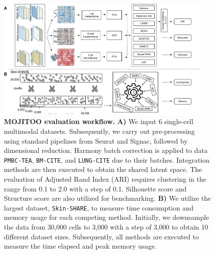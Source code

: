 \begin{figure}[!ht]
	\centering
	\includegraphics[width=0.95\textwidth]{evaluation_MOJITOO/fig}
	\vspace{0.1cm}
	\caption[MOJITOO evaluation workflow]{
	\textbf{MOJITOO evaluation workflow.} \textbf{A)} We input 6 single-cell multimodal datasets. Subsequently, we carry out pre-processing using standard pipelines from Seurat and Signac, followed by dimensional reduction. Harmony batch correction is applied to data \texttt{PMBC-TEA}, \texttt{BM-CITE}, and \texttt{LUNG-CITE} due to their batches. Integration methods are then executed to obtain the shared latent space. The evaluation of Adjusted Rand Index (ARI) requires clustering in the range from 0.1 to 2.0 with a step of 0.1. Silhouette score and Structure score are also utilized for benchmarking. \textbf{B)} We utilize the largest dataset, \texttt{Skin-SHARE}, to measure time consumption and memory usage for each competing method. Initially, we downsample the data from 30,000 cells to 3,000 with a step of 3,000 to obtain 10 different dataset sizes. Subsequently, all methods are executed to measure the time elapsed and peak memory usage.} 
	\label{fig:evaluation_MOJITOO}
\end{figure}

